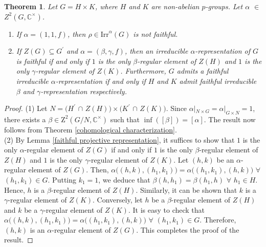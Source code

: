 \documentclass[a4paper,11pt]{amsart}
\numberwithin{equation}{section}
\numberwithin{equation}{subsection}
\newtheorem{theorem}{Theorem}[section]
\newcommand{\C}{\mathbb{C}}
\begin{document}
	\begin{theorem} \label{directproduct}
		Let $G = H \times K$, where $H$ and $K$ are non-abelian $p$-groups. Let $\alpha$ $\in$ $Z^{2}(G,\mathbb{C}^{\times})$. 
		\begin{enumerate}
			\item If $\alpha=(1,1,f)$, then $\rho \in \mathrm{Irr}^\alpha(G)$ is not faithful.
			
			\item If $Z(G) \subseteq G^{\prime}$ and $\alpha = (\beta,\gamma,f)$, then an irreducible $\alpha$-representation of $G$ is faithful if and only if $1$ is the only $\beta$-regular element of $Z(H)$ and $1$ is the only $\gamma$-regular element of $Z(K)$. Furthermore, $G$ admits a faithful irreducible $\alpha$-representation if and only if $H$ and $K$ admit faithful irreducible $\beta$ and $\gamma$-representation respectively.     
		\end{enumerate}
	\end{theorem}
	
	\begin{proof}
		(1) Let $N = \big(H^{\prime}$ $\cap$ $Z(H)\big) \times \big(K^{\prime}$ $\cap$ $Z(K)\big)$. Since $\alpha|_{N \times G} = \alpha|_{G \times N}= 1$, there exists a $\beta\in \mathrm{Z}^2(G/N, \C^{\times})$ such that $\operatorname{inf}([\beta])=[\alpha]$.  
		The result now follows from Theorem \ref{cohomological characterization}. 
		\\  
		
		(2) By Lemma \ref{faithful projective representation}, it suffices to show that $1$ is the only $\alpha$-regular element of $Z(G)$ if and only if $1$ is the only $\beta$-regular element of $Z(H)$ and $1$ is the only $\gamma$-regular element of $Z(K)$.    
		Let $(h,k)$ be an $\alpha$-regular element of $Z(G)$. Then, $\alpha \big((h,k),(h_1,k_1)\big)= \alpha\big((h_1,k_1),(h,k)\big)$ $\forall$ $(h_1,k_1) \in G$. Putting $k_1 = 1$, we deduce that $\beta(h,h_1) = \beta(h_1,h)$ $\forall$ $h_1 \in H$. Hence, $h$ is a $\beta$-regular element of $Z(H)$. Similarly, it can be shown that $k$ is a $\gamma$-regular element of $Z(K)$.
		Conversely, let $h$ be a $\beta$-regular element of $Z(H)$ and $k$ be a $\gamma$-regular element of $Z(K)$. It is easy to check that $\alpha\big((h,k),(h_1,k_1)\big)= \alpha\big((h_1,k_1),(h,k)\big)$ $\forall$ $(h_1,k_1)\in G$. Therefore, $(h,k)$ is an $\alpha$-regular element of $Z(G)$. This completes the proof of the result. 
	\end{proof}
	
\end{document}

